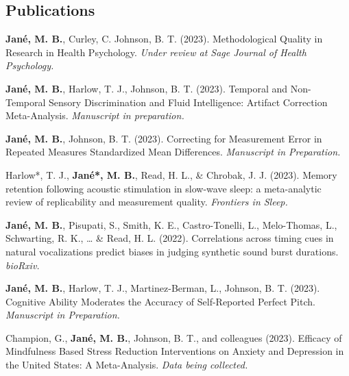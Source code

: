 \documentclass[
  letterpaper,
  DIV=11,
  numbers=noendperiod]{scrartcl}
\begin{document}
\hypertarget{publications}{%
\subsection{\texorpdfstring{
Publications}{ Publications}}\label{publications}}

\textbf{Jané, M. B.}, Curley, C. Johnson, B. T. (2023). Methodological
Quality in Research in Health Psychology. \emph{Under review at Sage
Journal of Health Psychology.}

\textbf{Jané, M. B.}, Harlow, T. J., Johnson, B. T. (2023). Temporal and
Non-Temporal Sensory Discrimination and Fluid Intelligence: Artifact
Correction Meta-Analysis. \emph{Manuscript in preparation.}

\textbf{Jané, M. B.}, Johnson, B. T. (2023). Correcting for Measurement
Error in Repeated Measures Standardized Mean Differences.
\emph{Manuscript in Preparation.}

Harlow*, T. J., \textbf{Jané*, M. B.}, Read, H. L., \& Chrobak, J. J.
(2023). Memory retention following acoustic stimulation in slow-wave
sleep: a meta-analytic review of replicability and measurement quality.
\emph{Frontiers in Sleep.}

\textbf{Jané, M. B.}, Pisupati, S., Smith, K. E., Castro-Tonelli, L.,
Melo-Thomas, L., Schwarting, R. K., \ldots{} \& Read, H. L. (2022).
Correlations across timing cues in natural vocalizations predict biases
in judging synthetic sound burst durations. \emph{bioRxiv.}

\textbf{Jané, M. B.}, Harlow, T. J., Martinez-Berman, L., Johnson, B. T.
(2023). Cognitive Ability Moderates the Accuracy of Self-Reported
Perfect Pitch. \emph{Manuscript in Preparation.}

Champion, G., \textbf{Jané, M. B.}, Johnson, B. T., and colleagues
(2023). Efficacy of Mindfulness Based Stress Reduction Interventions on
Anxiety and Depression in the United States: A Meta-Analysis. \emph{Data
being collected.}
\end{document}
